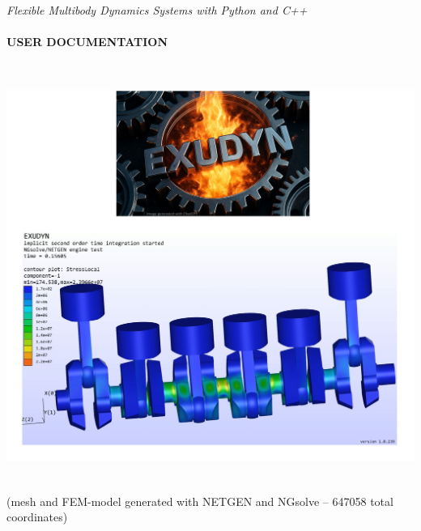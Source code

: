 \documentclass[11pt,a4paper]{book}
\begin{document}
\setcounter{page}{0}
\pagestyle{empty}

\begin{center}
{\Large {\it Flexible Multibody Dynamics Systems with Python and C++}}\vspace{1cm}\\
{\Huge {\bf \codeName}} \vspace{0.5cm}\\
{\Large \bf USER DOCUMENTATION} \vspace{1cm}\\
\vspace{0.2cm}
\begin{center}
	\includegraphics[height=14cm]{intro2.jpg}\\
	{\tiny (mesh and FEM-model generated with NETGEN and NGsolve -- 647058 total coordinates)}

\end{center}
\end{center}
\end{document}
